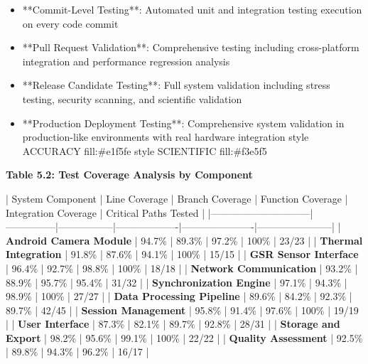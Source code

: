 \documentclass[12pt,a4paper]{article}
\begin{document}
\begin{itemize}
\item **Commit-Level Testing**: Automated unit and integration testing execution on every code commit
\item **Pull Request Validation**: Comprehensive testing including cross-platform integration and performance regression
  analysis
\item **Release Candidate Testing**: Full system validation including stress testing, security scanning, and scientific
  validation
\item **Production Deployment Testing**: Comprehensive system validation in production-like environments with real hardware
  integration
  style ACCURACY fill:\#e1f5fe
  style SCIENTIFIC fill:\#f3e5f5

\end{itemize}
\textbf{Table 5.2: Test Coverage Analysis by Component}

| System Component             | Line Coverage | Branch Coverage | Function Coverage | Integration Coverage | Critical Paths Tested |
|------------------------------|---------------|-----------------|-------------------|----------------------|-----------------------|
| \textbf{Android Camera Module}    | 94.7\%         | 89.3\%           | 97.2\%             | 100\%                 | 23/23                 |
| \textbf{Thermal Integration}      | 91.8\%         | 87.6\%           | 94.1\%             | 100\%                 | 15/15                 |
| \textbf{GSR Sensor Interface}     | 96.4\%         | 92.7\%           | 98.8\%             | 100\%                 | 18/18                 |
| \textbf{Network Communication}    | 93.2\%         | 88.9\%           | 95.7\%             | 95.4\%                | 31/32                 |
| \textbf{Synchronization Engine}   | 97.1\%         | 94.3\%           | 98.9\%             | 100\%                 | 27/27                 |
| \textbf{Data Processing Pipeline} | 89.6\%         | 84.2\%           | 92.3\%             | 89.7\%                | 42/45                 |
| \textbf{Session Management}       | 95.8\%         | 91.4\%           | 97.6\%             | 100\%                 | 19/19                 |
| \textbf{User Interface}           | 87.3\%         | 82.1\%           | 89.7\%             | 92.8\%                | 28/31                 |
| \textbf{Storage and Export}       | 98.2\%         | 95.6\%           | 99.1\%             | 100\%                 | 22/22                 |
| \textbf{Quality Assessment}       | 92.5\%         | 89.8\%           | 94.3\%             | 96.2\%                | 16/17                 |
\end{document}
